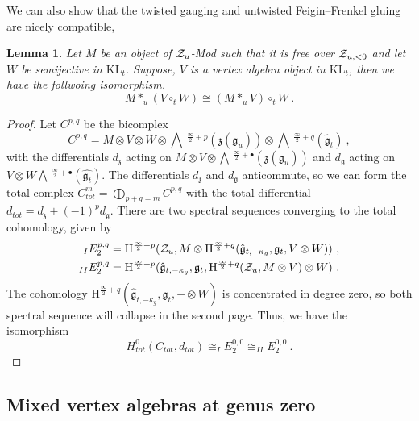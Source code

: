 \documentclass[a4paper]{article}
\newtheorem{lem}[thm]{Lemma}
\def\ZZ{{\cal Z}}
\def\gf{\mathfrak{g}}
\def \KL{\mathrm{KL}}
\newcommand{\Hi}[1]{\mathrm{H}^{\frac{\infty}{2}+#1}}
\newcommand{\Li}[1]{\mathrm{\bigwedge}\,^{\frac{\infty}{2}+#1}}
\begin{document}
We can also show that the twisted gauging and untwisted Feigin--Frenkel gluing are nicely compatible,
\begin{lem}\label{lem:ut-cap-gauge}
Let $M$ be an object of $\ZZ_u$-Mod such that it is free over $\ZZ_{u,<0}$ and let $W$ be semijective in $\KL_t$. Suppose, $V$ is a vertex algebra object in $\KL_t$, then we have the follwoing isomorphism.
\begin{equation*}
	M\ast_u(V\circ_t W)\cong (M\ast_u V)\circ_t W~.
\end{equation*}
\end{lem}
\begin{proof}
Let $C^{p,q}$ be the bicomplex
\begin{equation*}
	C^{p,q} = M\otimes V\otimes W \otimes \Li{p}(\mathfrak{z}(\gf_u))\otimes \Li{q}(\hat{\gf}_t)~,
\end{equation*}
with the differentials $d_\mathfrak{z}$ acting on $M\otimes V\otimes \Li{\bullet}(\mathfrak{z}(\gf_u))$ and $d_{\gf}$ acting on $V\otimes W \Li{\bullet}(\hat{\gf_t})$. The differentials $d_\mathfrak{z}$ and $d_\gf$ anticommute, so we can form the total complex $C^m_{tot} = \bigoplus_{p+q=m}C^{p,q}$ with the total differential $d_{tot}=d_\mathfrak{z}+(-1)^p d_\gf$. There are two spectral sequences converging to the total cohomology, given by
\begin{equation}\nonumber
	\begin{split}
	_{I} E^{p,q}_2 = \Hi{p}(\ZZ_u,M\otimes\Hi{q}(\hat{\gf}_{t,-\kappa_g},\gf_t,V\otimes W))~,\\
	_{II} E^{p,q}_2 = \Hi{p}(\hat{\gf}_{t,-\kappa_g},\gf_t,\Hi{q}(\ZZ_u,M\otimes V)\otimes W)~.
	\end{split}
\end{equation}
The cohomology $\Hi{q}(\hat{\gf}_{t,-\kappa_g},\gf_t,-\otimes W)$ is concentrated in degree zero, so both spectral sequence will collapse in the second page. Thus, we have the isomorphism
\begin{equation*}
	H^0_{tot}(C_{tot},d_{tot}) \cong _{I} E^{0,0}_2 \cong _{II} E^{0,0}_2~.
\end{equation*}
\end{proof}

\subsection{\label{subsec:mixed_at_genus_zero}Mixed vertex algebras at genus zero}
\end{document}

